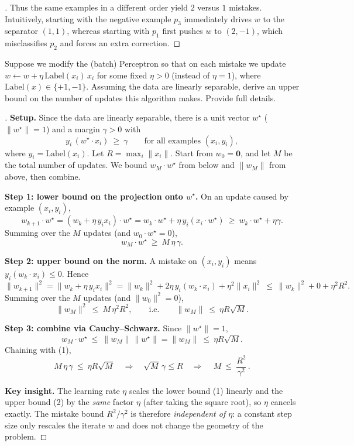 \documentclass[en,hazy,blue,12pt,normal]{../../elegantnote}
\begin{document}
\begin{proof}[\solutionname]
Thus the same examples in a different order yield $2$ versus $1$ mistakes. Intuitively, starting with
the negative example $p_3$ immediately drives $w$ to the separator $(1,1)$, whereas starting with
$p_1$ first pushes $w$ to $(2,-1)$, which misclassifies $p_2$ and forces an extra correction.
\end{proof}

\begin{homework}
Suppose we modify the (batch) Perceptron so that on each mistake we update
$w \leftarrow w + \eta\,\mathrm{Label}(x_i)\,x_i$ for some fixed $\eta>0$ (instead of $\eta=1$), where
$\mathrm{Label}(x)\in\{+1,-1\}$. Assuming the data are linearly separable, derive an upper bound on
the number of updates this algorithm makes. Provide full details.
\end{homework}

\begin{proof}[\solutionname]
\textbf{Setup.} Since the data are linearly separable, there is a unit vector $w^\star$
($\|w^\star\|=1$) and a margin $\gamma>0$ with
\[
y_i\,(w^\star\!\cdot x_i)\ \ge\ \gamma \qquad\text{for all examples } (x_i,y_i),
\]
where $y_i=\mathrm{Label}(x_i)$. Let $R=\max_i\|x_i\|$. Start from $w_0=\bm 0$, and let $M$ be the
total number of updates. We bound $w_M\cdot w^\star$ from below and $\|w_M\|$ from above, then combine.

\medskip
\textbf{Step 1: lower bound on the projection onto $w^\star$.}
On an update caused by example $(x_i,y_i)$,
\[
w_{k+1}\cdot w^\star = (w_k+\eta\,y_i x_i)\cdot w^\star
 = w_k\cdot w^\star + \eta\,y_i(x_i\cdot w^\star)
 \ \ge\ w_k\cdot w^\star + \eta\gamma .
\]
Summing over the $M$ updates (and $w_0\cdot w^\star=0$),
\[
w_M\cdot w^\star \ \ge\ M\,\eta\,\gamma. \tag{1}
\]

\textbf{Step 2: upper bound on the norm.}
A mistake on $(x_i,y_i)$ means $y_i(w_k\cdot x_i)\le 0$. Hence
\[
\|w_{k+1}\|^2 = \|w_k+\eta\,y_i x_i\|^2
 = \|w_k\|^2 + 2\eta\,y_i(w_k\cdot x_i) + \eta^2\|x_i\|^2
 \ \le\ \|w_k\|^2 + 0 + \eta^2 R^2 .
\]
Summing over the $M$ updates (and $\|w_0\|^2=0$),
\[
\|w_M\|^2 \ \le\ M\,\eta^2 R^2,\qquad\text{i.e.}\qquad \|w_M\|\ \le\ \eta R\sqrt{M}. \tag{2}
\]

\textbf{Step 3: combine via Cauchy--Schwarz.}
Since $\|w^\star\|=1$,
\[
w_M\cdot w^\star \ \le\ \|w_M\|\,\|w^\star\| = \|w_M\| \ \le\ \eta R\sqrt{M}.
\]
Chaining with (1),
\[
M\,\eta\,\gamma \ \le\ \eta R\sqrt{M}
\quad\Longrightarrow\quad
\sqrt{M}\,\gamma \le R
\quad\Longrightarrow\quad
\boxed{\,M \ \le\ \dfrac{R^2}{\gamma^2}\,}.
\]

\textbf{Key insight.} The learning rate $\eta$ scales the lower bound (1) linearly and the upper
bound (2) by the \emph{same} factor $\eta$ (after taking the square root), so $\eta$ cancels exactly.
The mistake bound $R^2/\gamma^2$ is therefore \emph{independent of $\eta$}: a constant step size only
rescales the iterate $w$ and does not change the geometry of the problem.
\end{proof}
\end{document}
